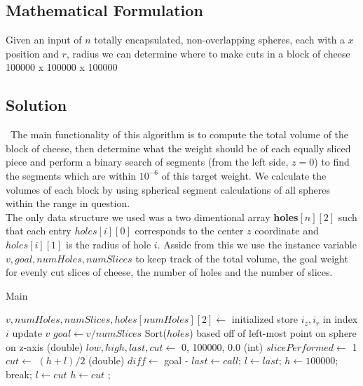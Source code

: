 \documentclass[12pt]{article}
\begin{document}

\newpage

\subsection{Mathematical Formulation}
Given an input of $n$ totally encapsulated, non-overlapping spheres, each with a $x$ position and $r$, radius we
can determine where to make cuts in a block of cheese 100000 x 100000 x 100000


\subsection{Solution}
~\indent The main functionality of this algorithm is to compute the total volume of the block of cheese, then determine
what the weight should be of each equally sliced piece and perform a binary search of segments (from the left
side, $z = 0$) to find the segments which are within $10^{-6}$ of this target weight. We calculate the volumes
of each block by using spherical segment calculations of all spheres within the range in question. \\
\indent The only data structure we used was a two dimentional array \textbf{holes$[n][2]$} such that
each entry $holes[i][0]$ corresponds to the center $z$ coordinate and $holes[i][1]$ is the radius of hole $i$.
Asside from this we use the instance variable $v, goal, numHoles, numSlices$ to keep track of the total volume,
the goal weight for evenly cut slices of cheese, the number of holes and the number of slices.

\begin{algorithm}[H]
\caption{Main}
\begin{algorithmic}
        \State $v, numHoles, numSlices, holes[numHoles][2] \gets$ initialized
            \State store $i_z, i_r$ in index $i$
            \State update $v$
        \EndFor
        \State $goal \gets v/numSlices$
        \State Sort($holes$) based off of left-most point on sphere on z-axis
        \State {}
    \EndProcedure
        \State (double) $low, high, last, cut \gets$ 0, 100000, 0.0
        \State (int) $slicePerformed \gets$ 1
            \State $cut \gets$ $(h + l)/2$
            \State (double) $diff \gets$ goal - 
                \State {}
                \State $last \gets call$; $l \gets last$; $h \gets 100000$;
                    break;
                \EndIf
                $l \gets cut$
            \Else
                $h \gets cut$
            \EndIf
        \EndWhile
        \State {};
    \EndProcedure
\end{algorithmic}
\end{algorithm}
\end{document}

